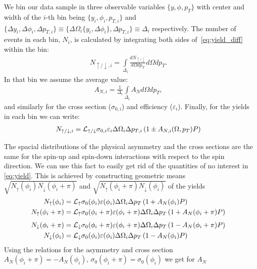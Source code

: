 \documentclass[12pt]{article}
\begin{document}
We bin our data sample in three observable variables $\{y, \phi, p_T\}$ with
center and width of the $i$-th bin being $\{y_i, \phi_i, p_{T,i}\}$ and
$\{\Delta y_i, \Delta\phi_i, \Delta p_{T,i}\} \equiv \{\Delta\Omega_i\{y_i,
\Delta\phi_i\}, \Delta p_{T,i}\} \equiv \Delta_i$ respectively. The number of
events in each bin, $N_i$, is calculated by integrating both sides
of~\eqref{eq:yield_diff} within the bin:
%
\begin{align}
N_{\uparrow/\downarrow, i} =
   \int\limits_{\Delta_i} \frac{dN_{\uparrow/\downarrow}}{d\Omega dp_T} d\Omega dp_T.
\end{align}
%
In that bin we assume the average value:
%
\begin{align}
A_{N,i} = \frac{1}{\Delta_i} \int\limits_{\Delta_i} A_N d\Omega dp_T,
\end{align}
%
and similarly for the cross section ($\sigma_{0,i}$) and efficiency
($\varepsilon_i$). Finally, for the yields in each bin we can write:
%
\begin{align}
N_{\uparrow/\downarrow, i} = {\cal L}_{\uparrow/\downarrow} \sigma_{0,i}
\varepsilon_i \Delta\Omega_i \Delta p_{T,i} \left( 1 \pm A_{N,i}(\Omega, p_T) P \right)
\label{eq:yield}
\end{align}

The spacial distributions of the physical asymmetry and the cross sections are
the same for the spin-up and spin-down interactions with respect to the spin
direction. We can use this fact to easily get rid of the  quantities of no
interest in \eqref{eq:yield}. This is achieved by constructing geometric
means $\sqrt{N_\uparrow(\phi_i)N_\downarrow(\phi_i+\pi)}$ and
$\sqrt{N_\uparrow(\phi_i+\pi)N_\downarrow(\phi_i)}$ of the yields
%
%
\begin{align}
N_\uparrow(\phi_i)       &= {\cal L_\uparrow}
   \sigma_{0}(\phi_i) \varepsilon(\phi_i)    \Delta\Omega_i \Delta p_T \left( 1 + A_{N}(\phi_i) P \right) \\
%
N_\uparrow(\phi_i+\pi)       &= {\cal L_\uparrow}
   \sigma_{0}(\phi_i+\pi) \varepsilon(\phi_i+\pi)    \Delta\Omega_i \Delta p_T \left( 1 + A_{N}(\phi_i+\pi) P \right)
\end{align}
%
%
\begin{align}
N_\downarrow(\phi_i+\pi) &= {\cal L_\downarrow}
   \sigma_{0}(\phi_i+\pi) \varepsilon(\phi_i+\pi) \Delta\Omega_i \Delta p_T \left( 1 - A_{N}(\phi_i+\pi) P \right) \\
%
N_\downarrow(\phi_i) &= {\cal L_\downarrow}
   \sigma_{0}(\phi_i) \varepsilon(\phi_i) \Delta\Omega_i \Delta p_T \left( 1 - A_{N}(\phi_i) P \right)
\end{align}
%
%
Using the relations for the asymmetry and cross section $A_{N}(\phi_i+\pi) =
-A_{N}(\phi_i)$, $\sigma_0(\phi_i+\pi) = \sigma_0(\phi_i)$ we get for $A_N$
\end{document}
